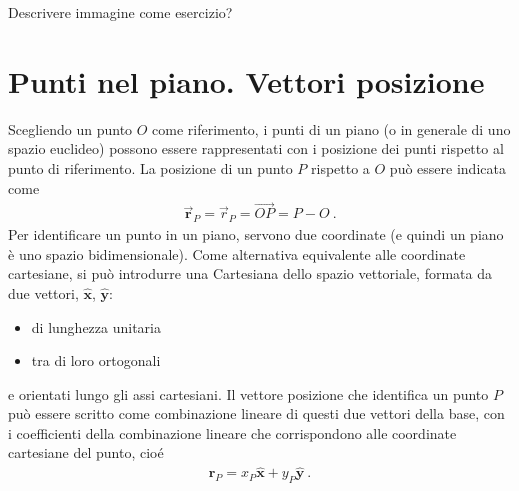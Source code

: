 \documentclass[letterpaper,10pt,italian]{jupyterBook}
\begin{document}
\sphinxAtStartPar
{} Descrivere immagine
  come esercizio?

\sphinxstepscope


\section{Punti nel piano. Vettori posizione}
\label{\detokenize{ch/analytic_geometry/analytic_geometry_2d/vectors:punti-nel-piano-vettori-posizione}}\label{\detokenize{ch/analytic_geometry/analytic_geometry_2d/vectors:geometry-analytic-2d-vectors}}\label{\detokenize{ch/analytic_geometry/analytic_geometry_2d/vectors::doc}}
\sphinxAtStartPar
Scegliendo un punto \(O\) come riferimento, i punti di un piano (o in generale di uno spazio euclideo) possono essere rappresentati con i {\hyperref[\detokenize{ch/algebra/vector-algebra:math-hs-algebra-vector}]{}} posizione dei punti rispetto al punto di riferimento. La posizione di un punto \(P\) rispetto a \(O\) può essere indicata come
\begin{equation*}
\begin{split}\vec{\mathbf{r}}_P = \vec{r}_P = \overrightarrow{OP} = P - O \ .\end{split}
\end{equation*}
\sphinxAtStartPar
Per identificare un punto in un piano, servono due coordinate (e quindi un piano è uno spazio bidimensionale). Come alternativa equivalente alle coordinate cartesiane, si può introdurre una  Cartesiana dello spazio vettoriale, formata da due vettori, \(\hat{\mathbf{x}}\), \(\hat{\mathbf{y}}\):
\begin{itemize}
\item {} 
\sphinxAtStartPar
di lunghezza unitaria

\item {} 
\sphinxAtStartPar
tra di loro ortogonali

\end{itemize}

\sphinxAtStartPar
e orientati lungo gli assi cartesiani. Il vettore posizione che identifica un punto \(P\) può essere scritto come combinazione lineare di questi due vettori della base, con i coefficienti della combinazione lineare che corrispondono alle coordinate cartesiane del punto, cioé
\begin{equation}\label{equation:ch/analytic_geometry/analytic_geometry_2d/vectors:eq:analytic-geometry:vector}
\begin{split}\mathbf{r}_P = x_P \hat{\mathbf{x}} + y_P \hat{\mathbf{y}} \ .\end{split}
\end{equation}
\end{document}
